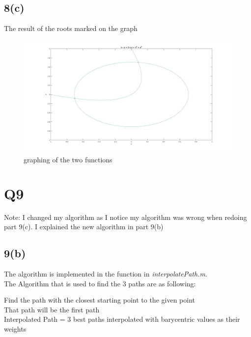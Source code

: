 \documentclass{article}
\begin{document}
\subsection*{8(c)}
The result of the roots marked on the graph
\begin{figure}[H]
\centering
\includegraphics[width=5in]{p8-2-new.jpg}
\caption{graphing of the two functions}
\end{figure}
\section{Q9}
Note: I changed my algorithm as I notice my algorithm was wrong when redoing part 9(c). I explained the new algorithm in part 9(b)
\subsection*{9(b)}
The algorithm is implemented in the function in \textit{interpolatePath.m}.\\
The Algorithm that is used to find the 3 paths are as following:

\begin{algorithm}
Find the path with the closest starting point to the given point\\
That path will be the first path\\
Interpolated Path = 3 best paths interpolated with barycentric values as their weights\;
\end{algorithm}
\end{document}
